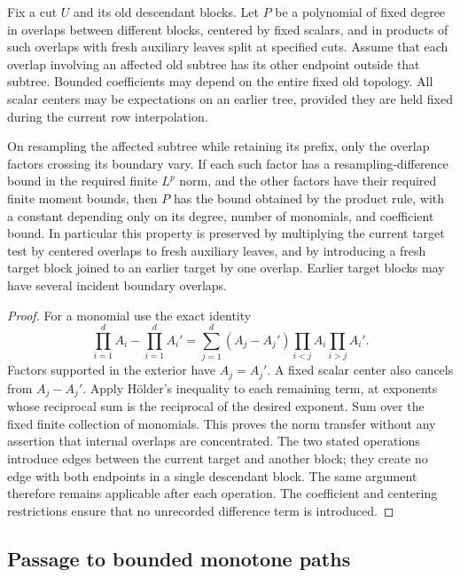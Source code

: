 \begin{lemma}\label{lem:found-boundary-tests}
Fix a cut $U$ and its old descendant blocks. Let $P$ be a polynomial of
fixed degree in overlaps between different blocks, centered by fixed
scalars, and in products of such overlaps with fresh auxiliary leaves
split at specified cuts. Assume that each overlap involving an affected
old subtree has its other endpoint outside that subtree. Bounded
coefficients may depend on the entire fixed old topology. All scalar
centers may be expectations on an earlier tree, provided they are held
fixed during the current row interpolation.

On resampling the affected subtree while retaining its prefix, only
the overlap factors crossing its boundary vary. If each such factor
has a resampling-difference bound in the required finite $L^p$ norm,
and the other factors have their required finite moment bounds, then
$P$ has the bound obtained by the product rule, with a constant
depending only on its degree, number of monomials, and coefficient bound.
In particular this property is preserved by multiplying the current
target test by centered overlaps to fresh auxiliary leaves, and by
introducing a fresh target block joined to an earlier target by one
overlap. Earlier target blocks may have several incident boundary
overlaps.
\end{lemma}

\begin{proof}
For a monomial use the exact identity
\[
 \prod_{i=1}^d A_i-\prod_{i=1}^d A_i'
    =\sum_{j=1}^d(A_j-A_j')
                   \prod_{i<j}A_i\prod_{i>j}A_i'.
\]
Factors supported in the exterior have $A_j=A_j'$. A fixed scalar center
also cancels from $A_j-A_j'$. Apply H\"older's inequality to each
remaining term, at exponents whose reciprocal sum is the reciprocal of
the desired exponent. Sum over the fixed finite collection of monomials.
This proves the norm transfer without any assertion that internal
overlaps are concentrated. The two stated operations introduce edges
between the current target and another block; they create no edge with
both endpoints in a single descendant block. The same argument
therefore remains applicable after each operation. The coefficient and
centering restrictions ensure that no unrecorded difference term is
introduced.
\end{proof}

\subsection{Passage to bounded monotone paths}

